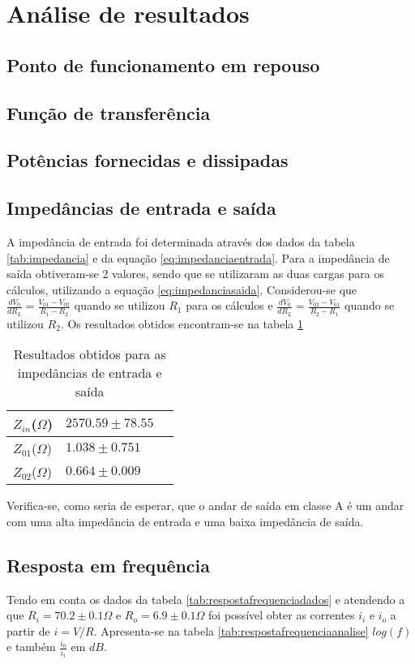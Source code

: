 \documentclass[%
  reprint,
  nofootinbib,
  amsmath,amssymb,
  aps,
  10pt,
  a4paper
]{revtex4-1}
\begin{document}
\section{Análise de resultados}
\label{s:aresul}
\subsection{Ponto de funcionamento em repouso}
\subsection{Função de transferência}
\subsection{Potências fornecidas e dissipadas}
\subsection{Impedâncias de entrada e saída}
A impedância de entrada foi determinada através dos dados da tabela \ref{tab:impedancia} e da equação \ref{eq:impedanciaentrada}. Para a impedância de saída obtiveram-se 2 valores, sendo que se utilizaram as duas cargas para os cálculos, utilizando a equação \ref{eq:impedanciasaida}. Considerou-se que $\frac{dV_0}{dR_L}=\frac{V_{01}-V_{02}}{R_1-R_2}$ quando se utilizou $R_1$ para os cálculos e $\frac{dV_0}{dR_L}=\frac{V_{02}-V_{01}}{R_2-R_1}$ quando se utilizou $R_2$. Os resultados obtidos encontram-se na tabela \ref{tab:analiseimpedancias}


\begin{table}[h]
    \begin{tabular}{|l|l|l|}
    \hline
    $Z_{in}$($\Omega$) & $2570.59 \pm 78.55$ \\ \hline
    $Z_{01}$($\Omega$) & $1.038\pm 0.751$  \\ \hline
    $Z_{02}$($\Omega$) & $0.664\pm0.009$  \\ \hline
    \end{tabular}
\caption{Resultados obtidos para as impedâncias de entrada e saída}
\label{tab:analiseimpedancias}
\end{table}

Verifica-se, como seria de esperar, que o andar de saída em classe A é um andar com uma alta impedância de entrada e uma baixa impedância de saída.


\subsection{Resposta em frequência}
Tendo em conta os dados da tabela \ref{tab:respostafrequenciadados} e atendendo a que $R_i=70.2 \pm 0.1\Omega$ e $R_o=6.9 \pm 0.1\Omega$ foi possível obter as correntes $i_i$ e $i_o$ a partir de $i=V/R$. Apresenta-se na tabela \ref{tab:respostafrequenciaanalise} $log(f)$ e também $\frac{i_0}{i_i}$ em $dB$. 
\end{document}
